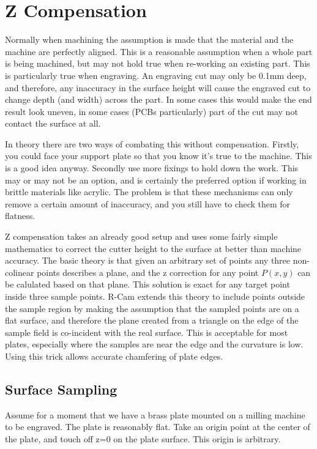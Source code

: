 \chapter{Z Compensation}

Normally when machining the assumption is made that the material and the machine are perfectly aligned. This is a reasonable assumption when a whole part is being machined, but may not hold true when re-working an existing part. This is particularly true when engraving. An engraving cut may only be 0.1mm deep, and therefore, any inaccuracy in the surface height will cause the engraved cut to change depth (and width) across the part. In some cases this would make the end result look uneven, in some cases (PCBs particularly) part of the cut may not contact the surface at all.

In theory there are two ways of combating this without compensation. Firstly, you could face your support plate so that you know it's true to the machine. This is a good idea anyway. Secondly use more fixings to hold down the work. This may or may not be an option, and is certainly the preferred option if working in brittle materials like acrylic. The problem is that these mechanisms can only remove a certain amount of inaccuracy, and you still have to check them for flatness.

Z compensation takes an already good setup and uses some fairly simple mathematics to correct the cutter height to the surface at better than machine accuracy. The basic theory is that given an arbitrary set of points any three non-colinear points describes a plane, and the z correction for any point $ P(x,y) $ can be calulated based on that plane. This solution is exact for any target point inside three sample points. R-Cam extends this theory to include points outside the sample region by making the assumption that the sampled points are on a flat surface, and therefore the plane created from a triangle on the edge of the sample field is co-incident with the real surface. This is acceptable for most plates, especially where the samples are near the edge and the curvature is low. Using this trick allows accurate chamfering of plate edges.

\section{Surface Sampling}

Assume for a moment that we have a brass plate mounted on a milling machine to be engraved. The plate is reasonably flat. Take an origin point at the center of the plate, and touch off z=0 on the plate surface. This origin is arbitrary.

